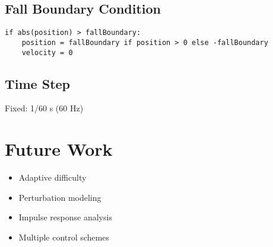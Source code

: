 \documentclass[11pt]{article}
\begin{document}
\subsection{Fall Boundary Condition}
\begin{verbatim}
if abs(position) > fallBoundary:
    position = fallBoundary if position > 0 else -fallBoundary
    velocity = 0
\end{verbatim}

\subsection{Time Step}
Fixed: 1/60 s (60 Hz)

\section{Future Work}
\begin{itemize}
  \item Adaptive difficulty
  \item Perturbation modeling
  \item Impulse response analysis
  \item Multiple control schemes
\end{itemize}
\end{document}

